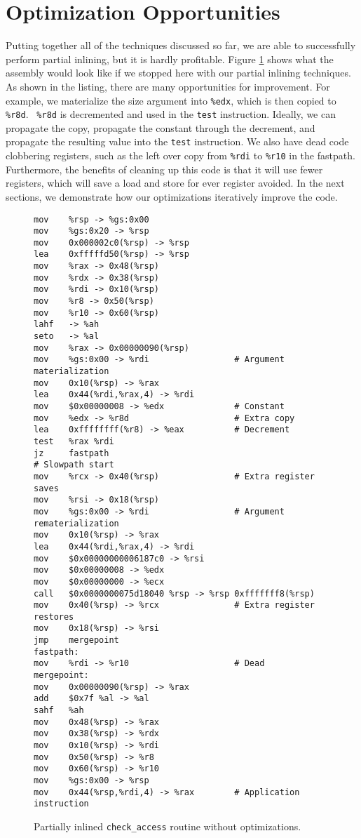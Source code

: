 \section{Optimization Opportunities}

Putting together all of the techniques discussed so far, we are able to
successfully perform partial inlining, but it is hardly profitable.  Figure
\ref{fig:alignment_partial_noopt} shows what the assembly would look like if we
stopped here with our partial inlining techniques.  As shown in the listing,
there are many opportunities for improvement.  For example, we materialize the
size argument into {\tt \%edx}, which is then copied to {\tt \%r8d}.  {\tt
\%r8d} is decremented and used in the {\tt test} instruction.  Ideally, we can
propagate the copy, propagate the constant through the decrement, and propagate
the resulting value into the {\tt test} instruction.  We also have dead code
clobbering registers, such as the left over copy from {\tt \%rdi} to {\tt \%r10}
in the fastpath.  Furthermore, the benefits of cleaning up this code is that it
will use fewer registers, which will save a load and store for ever register
avoided.  In the next sections, we demonstrate how our optimizations iteratively
improve the code.

\begin{figure}
\begin{verbatim}
mov    %rsp -> %gs:0x00
mov    %gs:0x20 -> %rsp
mov    0x000002c0(%rsp) -> %rsp
lea    0xfffffd50(%rsp) -> %rsp
mov    %rax -> 0x48(%rsp)
mov    %rdx -> 0x38(%rsp)
mov    %rdi -> 0x10(%rsp)
mov    %r8 -> 0x50(%rsp)
mov    %r10 -> 0x60(%rsp)
lahf   -> %ah
seto   -> %al
mov    %rax -> 0x00000090(%rsp)
mov    %gs:0x00 -> %rdi                 # Argument materialization
mov    0x10(%rsp) -> %rax
lea    0x44(%rdi,%rax,4) -> %rdi
mov    $0x00000008 -> %edx              # Constant
mov    %edx -> %r8d                     # Extra copy
lea    0xffffffff(%r8) -> %eax          # Decrement
test   %rax %rdi
jz     fastpath
# Slowpath start
mov    %rcx -> 0x40(%rsp)               # Extra register saves
mov    %rsi -> 0x18(%rsp)
mov    %gs:0x00 -> %rdi                 # Argument rematerialization
mov    0x10(%rsp) -> %rax
lea    0x44(%rdi,%rax,4) -> %rdi
mov    $0x00000000006187c0 -> %rsi
mov    $0x00000008 -> %edx
mov    $0x00000000 -> %ecx
call   $0x0000000075d18040 %rsp -> %rsp 0xfffffff8(%rsp)
mov    0x40(%rsp) -> %rcx               # Extra register restores
mov    0x18(%rsp) -> %rsi
jmp    mergepoint
fastpath:
mov    %rdi -> %r10                     # Dead
mergepoint:
mov    0x00000090(%rsp) -> %rax
add    $0x7f %al -> %al
sahf   %ah
mov    0x48(%rsp) -> %rax
mov    0x38(%rsp) -> %rdx
mov    0x10(%rsp) -> %rdi
mov    0x50(%rsp) -> %r8
mov    0x60(%rsp) -> %r10
mov    %gs:0x00 -> %rsp
mov    0x44(%rsp,%rdi,4) -> %rax        # Application instruction
\end{verbatim}
\caption{Partially inlined {\tt check\_access} routine without optimizations.}
\label{fig:alignment_partial_noopt}
\end{figure}

